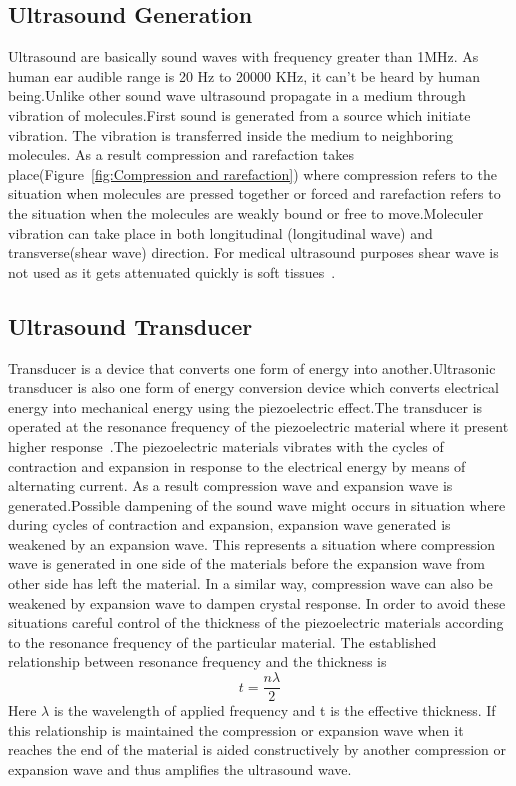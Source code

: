 \subsection{Ultrasound Generation}
Ultrasound are basically sound waves with frequency greater than 1MHz. As human ear audible range is 20 Hz to 20000 KHz, it can't be heard by human being.Unlike other sound wave ultrasound propagate in a medium through vibration of molecules.First sound is generated from a source which initiate vibration. The vibration is transferred inside the medium to neighboring molecules. As a result compression and rarefaction takes place(Figure~\ref{fig:Compression and rarefaction}) where compression refers to the situation when molecules are pressed together or forced and rarefaction refers to the situation when the molecules are weakly bound or free to move.Moleculer vibration can take place in both longitudinal (longitudinal wave) and transverse(shear wave) direction. For medical ultrasound purposes shear wave is not used as it gets attenuated quickly is soft tissues~\cite{Hynynen...5,Carson.1978.JCU.126,Hunt.1987..354,Hynynen.1990..61}.




\subsection{Ultrasound Transducer}
Transducer is a device that converts one form of energy into another.Ultrasonic transducer is also one form of energy conversion device which converts electrical energy into mechanical energy using the piezoelectric effect.The transducer is operated at the resonance frequency of the piezoelectric material where it present higher response~\cite{Takasaki.2007..3817}.The piezoelectric materials vibrates with the cycles of contraction and expansion in response to the electrical energy by means of alternating current. As a result compression wave and expansion wave is generated.Possible dampening of the sound wave might occurs in situation where during cycles of contraction and expansion, expansion wave generated is weakened by an expansion wave. This represents a situation where compression wave is generated in one side of the materials before the expansion wave from other side has left the material. In a similar way, compression wave can also be weakened by expansion wave to dampen crystal response. In order to avoid these situations  careful control of the thickness of the piezoelectric materials according to the resonance frequency of the particular material. The established relationship between resonance frequency  and the thickness is
 \begin{equation}\label{Eq:Effectivethichness-frequency}
    t=\frac{n\lambda}{2}
\end{equation}
Here $\lambda$ is the wavelength of applied frequency and t is the effective thickness.
If this relationship is maintained the compression or expansion wave when it reaches the end of the material is aided constructively by another compression or expansion wave and thus amplifies the ultrasound wave.

